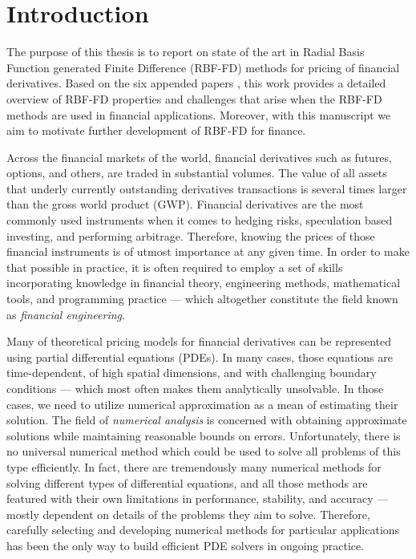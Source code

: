 \documentclass{UUThesisTemplate}
\begin{document}
\chapter{Introduction}
\label{ch:introduction}
\par The purpose of this thesis is to report on state of the art in Radial Basis Function generated Finite Difference (RBF-FD) methods for pricing of financial derivatives. Based on the six appended papers \cite{paper1,paper2,paper3,paper4,paper5,paper6}, this work provides a detailed overview of RBF-FD properties and challenges that arise when the RBF-FD methods are used in financial applications. Moreover, with this manuscript we aim to motivate further development of RBF-FD for finance.
\par Across the financial markets of the world, financial derivatives such as futures, options, and others, are traded in substantial volumes. The value of all assets that underly currently outstanding derivatives transactions is several times larger than the gross world product (GWP). Financial derivatives are the most commonly used instruments when it comes to hedging risks, speculation based investing, and performing arbitrage. Therefore, knowing the prices of those financial instruments is of utmost importance at any given time. In order to make that possible in practice, it is often required to employ a set of skills incorporating knowledge in financial theory, engineering methods, mathematical tools, and programming practice --- which altogether constitute the field known as \emph{financial engineering}. 
\par Many of theoretical pricing models for financial derivatives can be represented using partial differential equations (PDEs). In many cases, those equations are time-dependent, of high spatial dimensions, and with challenging boundary conditions --- which most often makes them analytically unsolvable. In those cases, we need to utilize numerical approximation as a mean of estimating their solution. The field of \emph{numerical analysis} is concerned with obtaining approximate solutions while maintaining reasonable bounds on errors. Unfortunately, there is no universal numerical method which could be used to solve all problems of this type efficiently. In fact, there are tremendously many numerical methods for solving different types of differential equations, and all those methods are featured with their own limitations in performance, stability, and accuracy --- mostly dependent on details of the problems they aim to solve. Therefore, carefully selecting and developing numerical methods for particular applications has been the only way to build efficient PDE solvers in ongoing practice. 
\end{document}
